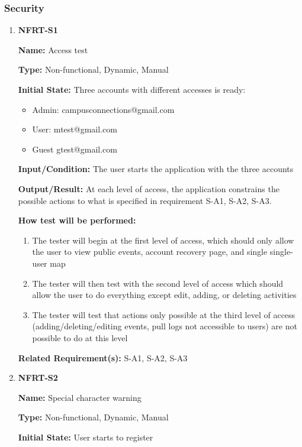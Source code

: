 \documentclass[12pt, titlepage]{article}
\begin{document}
\subsubsection{Security}

\begin{enumerate}
\item{\textbf{NFRT-S1}}

\textbf{Name:} Access test
  
\textbf{Type:} Non-functional, Dynamic, Manual
            
\textbf{Initial State:} Three accounts with different accesses is ready:
\begin{itemize}
\item Admin: campusconnections@gmail.com
\item User: mtest@gmail.com
\item Guest gtest@gmail.com
\end{itemize}
  
\textbf{Input/Condition:} The user starts the application with the three accounts
            
\textbf{Output/Result:} At each level of access, the application constrains the possible actions to what is specified in requirement S-A1, S-A2, S-A3.
  
\textbf{How test will be performed:}
\begin{enumerate}
  \item The tester will begin at the first level of access, which should only allow the user to view public events,  account recovery page, and single single-user map
  \item The tester will then test with the second level of access which should allow the user to do everything except edit, adding, or deleting activities
  \item The tester will test that actions only possible at the third level of access (adding/deleting/editing events, pull logs not accessible to users) are not possible to do at this level
\end{enumerate}

\textbf{Related Requirement(s):} S-A1, S-A2, S-A3

\item{\textbf{NFRT-S2}}

\textbf{Name:} Special character warning

\textbf{Type:} Non-functional, Dynamic, Manual
					
\textbf{Initial State:} User starts to register
					

\end{enumerate}
\end{document}
